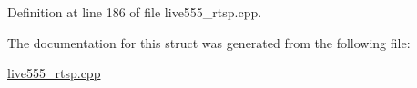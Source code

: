 Definition at line 186 of file live555\+\_\+rtsp.\+cpp.



The documentation for this struct was generated from the following file\+:\begin{DoxyCompactItemize}
\item 
\hyperlink{live555__rtsp_8cpp}{live555\+\_\+rtsp.\+cpp}\end{DoxyCompactItemize}
